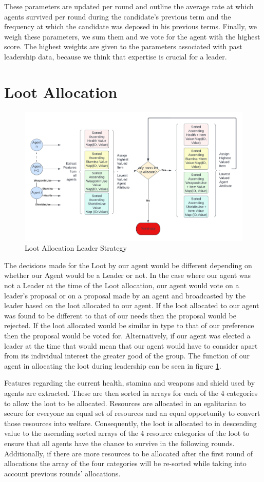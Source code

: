 These parameters are updated per round and outline the average rate at which agents survived per round during the candidate's previous term and the frequency at which the candidate was deposed in his previous terms.
Finally, we weigh these parameters, we sum them and we vote for the agent with the highest score. The highest weights are given to the parameters associated with past leadership data, because we think that expertise is crucial for a leader.\\

\section{Loot Allocation}

\begin{figure}[!ht]
    \centering
    \includegraphics[width=0.8\linewidth]{005_team_2_agent_design/Resources/lootAllocation.png}
    \caption{Loot Allocation Leader Strategy}
    \label{fig:loot}
\end{figure}
The decisions made for the Loot by our agent would be different depending on whether our Agent would be a Leader or not. In the case where our agent was not a Leader at the time of the Loot allocation, our agent would vote on a leader's proposal or on a proposal made by an agent and broadcasted by the leader based on the loot allocated to our agent. If the loot allocated to our agent was found to be different to that of our needs then the proposal would be rejected. If the loot allocated would be similar in type to that of our preference then the proposal would be voted for.
Alternatively, if our agent was elected a leader at the time that would mean that our agent would have to consider apart from its individual interest the greater good of the group. The function of our agent in allocating the loot during leadership can be seen in figure \ref{fig:loot}.

Features regarding the current health, stamina and weapons and shield used by agents are extracted. These are then sorted in arrays for each of the 4 categories to allow the loot to be allocated. Resources are allocated in an egalitarian to secure for everyone an equal set of resources and an equal opportunity to convert those resources into welfare. Consequently, the loot is allocated to in descending value to the ascending sorted arrays of the 4 resource categories of the loot to ensure that all agents have the chance to survive in the following rounds.
Additionally, if there are more resources to be allocated after the first round of allocations the array of the four categories will be re-sorted while taking into account previous rounds' allocations.

